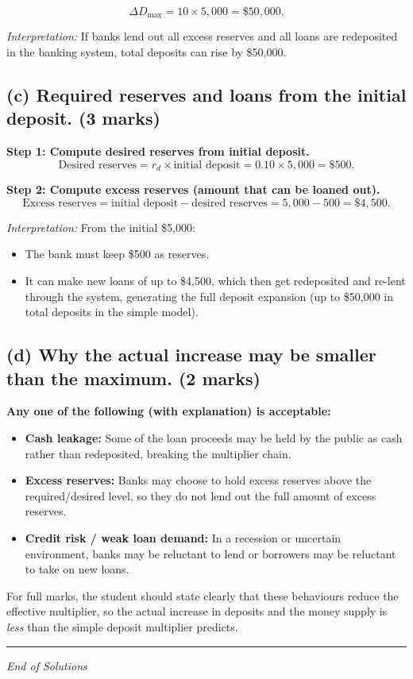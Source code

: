 \documentclass[12pt]{article}
\begin{document}
\[
\Delta D_{\max} = 10 \times 5{,}000 = \boxed{\$50{,}000}.
\]

\textit{Interpretation:} If banks lend out all excess reserves and all loans are redeposited in the banking system, total deposits can rise by \$50,000.

\subsection*{(c) Required reserves and loans from the initial deposit. (3 marks)}

\textbf{Step 1: Compute desired reserves from initial deposit.}
\[
\text{Desired reserves} = r_d \times \text{initial deposit} = 0.10 \times 5{,}000 = \boxed{\$500}.
\]

\textbf{Step 2: Compute excess reserves (amount that can be loaned out).}
\[
\text{Excess reserves} = \text{initial deposit} - \text{desired reserves} 
= 5{,}000 - 500 = \boxed{\$4{,}500}.
\]

\textit{Interpretation:}  
From the initial \$5,000:
\begin{itemize}
    \item The bank must keep \$500 as reserves.
    \item It can make new loans of up to \$4,500, which then get redeposited and re-lent through the system, generating the full deposit expansion (up to \$50,000 in total deposits in the simple model).
\end{itemize}

\subsection*{(d) Why the actual increase may be smaller than the maximum. (2 marks)}

\textbf{Any one of the following (with explanation) is acceptable:}
\begin{itemize}
    \item \textbf{Cash leakage:} Some of the loan proceeds may be held by the public as cash rather than redeposited, breaking the multiplier chain.
    \item \textbf{Excess reserves:} Banks may choose to hold excess reserves above the required/desired level, so they do not lend out the full amount of excess reserves.
    \item \textbf{Credit risk / weak loan demand:} In a recession or uncertain environment, banks may be reluctant to lend or borrowers may be reluctant to take on new loans.
\end{itemize}

For full marks, the student should state clearly that these behaviours reduce the effective multiplier, so the actual increase in deposits and the money supply is \emph{less} than the simple deposit multiplier predicts.

\hrule
\vspace{1em}

\begin{center}
\textit{End of Solutions}
\end{center}
\end{document}
